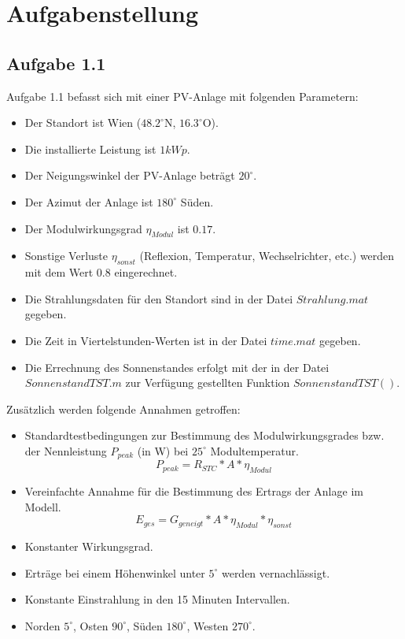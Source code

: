 \documentclass[a4paper,12pt]{article}
\begin{document}
	
	
	\newpage
	\tableofcontents
	
	\newpage
	\section{Aufgabenstellung}
	\subsection{Aufgabe 1.1}
	Aufgabe 1.1 befasst sich mit einer PV-Anlage mit folgenden Parametern:
	\begin{itemize}
		\item Der Standort ist Wien ($48.2^{\circ}$N, $16.3^{\circ}$O).
		\item Die installierte Leistung ist $1kWp$.
		\item Der Neigungswinkel der PV-Anlage beträgt $20^{\circ}$.
		\item Der Azimut der Anlage ist $180^{\circ}$ Süden.
		\item Der Modulwirkungsgrad $\eta_{Modul}$ ist $0.17$.
		\item Sonstige Verluste $\eta_{sonst}$ (Reflexion, Temperatur, Wechselrichter, etc.) werden mit dem Wert $0.8$ eingerechnet.
		\item Die Strahlungsdaten für den Standort sind in der Datei $Strahlung.mat$ gegeben.
		\item Die Zeit in Viertelstunden-Werten ist in der Datei $time.mat$ gegeben.
		\item Die Errechnung des Sonnenstandes erfolgt mit der in der Datei $SonnenstandTST.m$ zur Verfügung gestellten Funktion $SonnenstandTST()$.
	\end{itemize}
	Zusätzlich werden folgende Annahmen getroffen:
	\begin{itemize}
		\item Standardtestbedingungen zur Bestimmung des Modulwirkungsgrades bzw. der Nennleistung $P_{peak}$ (in W) bei $25^{\circ}$ Modultemperatur.
		\begin{equation}
			P_{peak}=R_{STC}*A*\eta_{Modul}
		\end{equation}
		\item Vereinfachte Annahme für die Bestimmung des Ertrags der Anlage im Modell.
		\begin{equation}
			E_{ges}=G_{geneigt}*A*\eta_{Modul}*\eta_{sonst}
		\end{equation}
		\item Konstanter Wirkungsgrad.
		\item Erträge bei einem Höhenwinkel unter $5^{\circ}$ werden vernachlässigt.
		\item Konstante Einstrahlung in den 15 Minuten Intervallen.
		\item Norden $5^{\circ}$, Osten $90^{\circ}$, Süden $180^{\circ}$, Westen $270^{\circ}$.
	\end{itemize}
\end{document}
